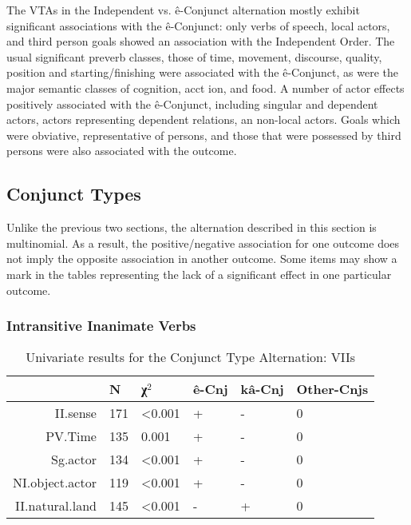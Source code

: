 The VTAs in the Independent vs. ê-Conjunct alternation mostly exhibit significant associations with the ê-Conjunct: only verbs of speech, local actors, and third person goals showed an association with the Independent Order. The usual significant preverb classes, those of time, movement, discourse, quality, position and starting/finishing were associated with the ê-Conjunct, as were the major semantic classes of cognition, acct ion, and food. A number of actor effects positively associated with the ê-Conjunct, including singular and dependent actors, actors representing dependent relations, an non-local actors. Goals which were obviative, representative of persons, and those that were possessed by third persons were also associated with the outcome. 
\FloatBarrier


\FloatBarrier

\subsection{Conjunct Types}
Unlike the previous two sections, the alternation described in this section is multinomial. As a result, the positive/negative association for one outcome does not imply the opposite association in another outcome. Some items may show a  mark in the tables representing the lack of a significant effect in one particular outcome. 
\FloatBarrier

\subsubsection{Intransitive Inanimate Verbs}

\begin{table}[H]
  \centering
  \footnotesize
\begin{tabular}{rlllll}
    \toprule
 & N & χ$^{2}$ & ê-Cnj & kâ-Cnj & Other-Cnjs \\
\midrule
II.sense & 171 & \textless{}0.001 & + & - & 0\\
PV.Time & 135 & 0.001 & + & - & 0\\
Sg.actor & 134 & \textless{}0.001 & + & - & 0\\
NI.object.actor & 119 & \textless{}0.001 & + & - & 0\\
II.natural.land & 145 & \textless{}0.001 & - & + & 0\\

  
  \bottomrule
  \end{tabular}
  \caption{
   Univariate results for the Conjunct Type Alternation: VIIs \\ \label{tab:iicnjuni}
  }
\end{table}


